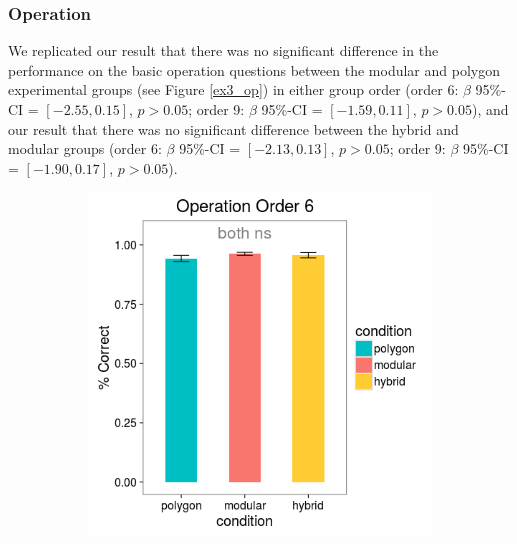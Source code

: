 \documentclass[11pt]{article}
\begin{document}
\subsubsection{Operation}
We replicated our result that there was no significant difference in the performance on the basic operation questions between the modular and polygon experimental groups (see Figure \ref{ex3_op}) in either group order (order 6: $\beta$ 95\%-CI = $[-2.55,0.15]$, $p > 0.05$; order 9: $\beta$ 95\%-CI = $[-1.59,0.11]$, $p > 0.05$), and our result that there was no significant difference between the hybrid and modular groups (order 6:  $\beta$ 95\%-CI = $[-2.13,0.13]$, $p > 0.05$; order 9: $\beta$ 95\%-CI = $[-1.90,0.17]$, $p > 0.05$).
\begin{figure}[H]
\centering
\begin{subfigure}[c]{0.4\textwidth}
\centering
\includegraphics[width=\textwidth]{figures/3/op_6_r.png}
\end{subfigure}
~
\begin{subfigure}[c]{0.4\textwidth}
\centering

\end{subfigure}
\end{figure}
\end{document}
